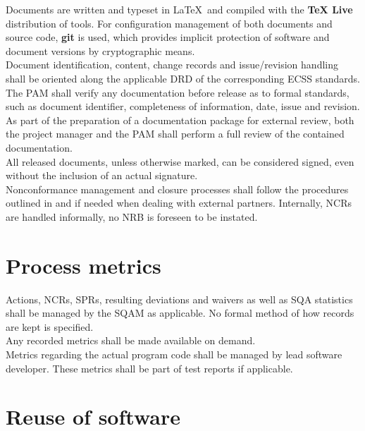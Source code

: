 Documents are written and typeset in \LaTeX\ and compiled with the \textbf{TeX Live}
distribution of tools. For configuration management of both documents and source
code, \textbf{git} is used, which provides implicit protection of software and
document versions by cryptographic means.\\

\noindent
Document identification, content, change records and issue/revision handling
shall be oriented along the applicable \gls{DRD} of the corresponding ECSS
standards.\\

\noindent
The \gls{PAM} shall verify any documentation before release as to formal
standards, such as document identifier, completeness of information, date,
issue and revision.\\

\noindent
As part of the preparation of a documentation package for external review, both
the project manager and the \gls{PAM} shall perform a full review of the
contained documentation.\\

\noindent
All released documents, unless otherwise marked, can be considered signed, even
without the inclusion of an actual signature.\\

\noindent
Nonconformance management and closure processes shall follow the procedures
outlined in \cite{ECSS80C} and \cite{ECSSQ1009C} if needed when dealing with
external partners. Internally, \glspl{NCR} are handled informally, no \gls{NRB}
is foreseen to be instated.


\section{Process metrics}

Actions, \glspl{NCR}, \glspl{SPR}, resulting deviations and waivers as
well as \gls{SQA} statistics shall be managed by the \gls{SQAM} as applicable.
No formal method of how records are kept is specified.\\

\noindent
Any recorded metrics shall be made available on demand.\\

\noindent
Metrics regarding the actual program code shall be managed by lead software
developer. These metrics shall be part of test reports if applicable.


\section{Reuse of software}

